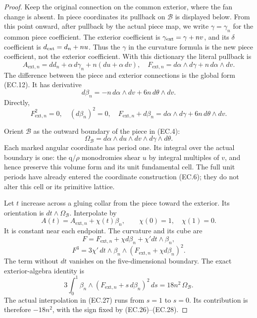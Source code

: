 \begin{proof}
Keep the original connection on the common exterior, where the
fan change is absent. In piece coordinates its pullback on
\(\mathcal B\) is displayed below. From this point onward, after
pullback by the actual piece map, we write \(\gamma=\gamma_n\)
for the common piece coefficient. The exterior coefficient is
\(\gamma_{\rm ext}=\gamma+nv\), and its \(\delta\) coefficient is
\(d_{\rm ext}=d_n+nu\). Thus the \(\gamma\) in the curvature
formula is the new piece coefficient, not the exterior coefficient.
With this dictionary the literal pullback is
\[
 A_{\mathrm{ext},n}
   =dd_n+\alpha\,d\gamma_n+n(du+\alpha\,dv),
\quad
 F_{\mathrm{ext},n}
   =d\alpha\wedge d\gamma+n\,d\alpha\wedge dv.
                                                        \tag{EC.23}
\]
The difference between the piece and exterior connections is
the global form (EC.12). It has derivative
\[
 d\beta_n=-n\,d\alpha\wedge dv+6n\,d\theta\wedge dv .
                                                        \tag{EC.24}
\]
Directly,
\[
 F_{\mathrm{ext},n}^2=0,\quad (d\beta_n)^2=0,
\quad F_{\mathrm{ext},n}+d\beta_n
            =d\alpha\wedge d\gamma+6n\,d\theta\wedge dv .
                                                        \tag{EC.25}
\]

Orient \(\mathcal B\) as the outward boundary of the piece in
(EC.4):
\[
 \Omega_{\mathcal B}
       =d\alpha\wedge du\wedge dv\wedge d\gamma\wedge d\theta .
                                                        \tag{EC.26}
\]
Each marked angular coordinate has period one. Its integral
over the actual boundary is one: the q/\(\rho\) monodromies shear
\(u\) by integral multiples of \(v\), and hence preserve this
volume form and its unit fundamental cell. The full unit
periods have already entered the coordinate construction
(EC.6); they do not alter this cell or its primitive lattice.

Let \(t\) increase across a gluing collar from the piece toward
the exterior. Its orientation is \(dt\wedge\Omega_{\mathcal B}\).
Interpolate by
\[
 A(t)=A_{\mathrm{ext},n}+\chi(t)\beta_n,\qquad
                  \chi(0)=1,\quad\chi(1)=0.
                                                        \tag{EC.27}
\]
It is constant near each endpoint. The curvature and its cube
are
\[
 F=F_{\mathrm{ext},n}+\chi d\beta_n
                           +\chi' dt\wedge\beta_n,
\]
\[
 F^3=3\chi'\,dt\wedge
          \beta_n\wedge(F_{\mathrm{ext},n}+\chi d\beta_n)^2 .
                                                        \tag{EC.28}
\]
The term without \(dt\) vanishes on the five-dimensional boundary.
The exact exterior-algebra identity is
\[
 3\int_0^1
   \beta_n\wedge(F_{\mathrm{ext},n}+s\,d\beta_n)^2\,ds
                    =18n^2\,\Omega_{\mathcal B}.        \tag{EC.29}
\]
The actual interpolation in (EC.27) runs from \(s=1\) to \(s=0\).
Its contribution is therefore \(-18n^2\), with the sign fixed
by (EC.26)--(EC.28).


\end{proof}
